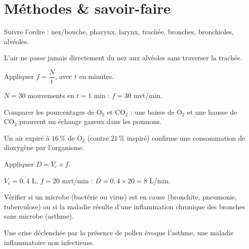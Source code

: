 \section{Méthodes \& savoir-faire}

Suivre l'ordre : nez/bouche, pharynx, larynx, trachée, bronches, bronchioles, alvéoles.
\begin{exemple}
L'air ne passe jamais directement du nez aux alvéoles sans traverser la trachée.
\end{exemple}

Appliquer $f=\dfrac Nt$, avec $t$ en minutes.
\begin{exemple}
$N=30$ mouvements en $t=1$ min : $f=30$ mvt/min.
\end{exemple}

Comparer les pourcentages de $\mathrm{O_2}$ et $\mathrm{CO_2}$ : une baisse de
$\mathrm{O_2}$ et une hausse de $\mathrm{CO_2}$ prouvent un échange gazeux dans les
poumons.
\begin{exemple}
Un air expiré à $16\,\%$ de $\mathrm{O_2}$ (contre $21\,\%$ inspiré) confirme une
consommation de dioxygène par l'organisme.
\end{exemple}

Appliquer $D=V_c\times f$.
\begin{exemple}
$V_c=0{,}4$ L, $f=20$ mvt/min : $D=0{,}4\times20=8$ L/min.
\end{exemple}

Vérifier si un microbe (bactérie ou virus) est en cause (bronchite, pneumonie,
tuberculose) ou si la maladie résulte d'une inflammation chronique des bronches sans
microbe (asthme).
\begin{exemple}
Une crise déclenchée par la présence de pollen évoque l'asthme, une maladie
inflammatoire non infectieuse.
\end{exemple}

